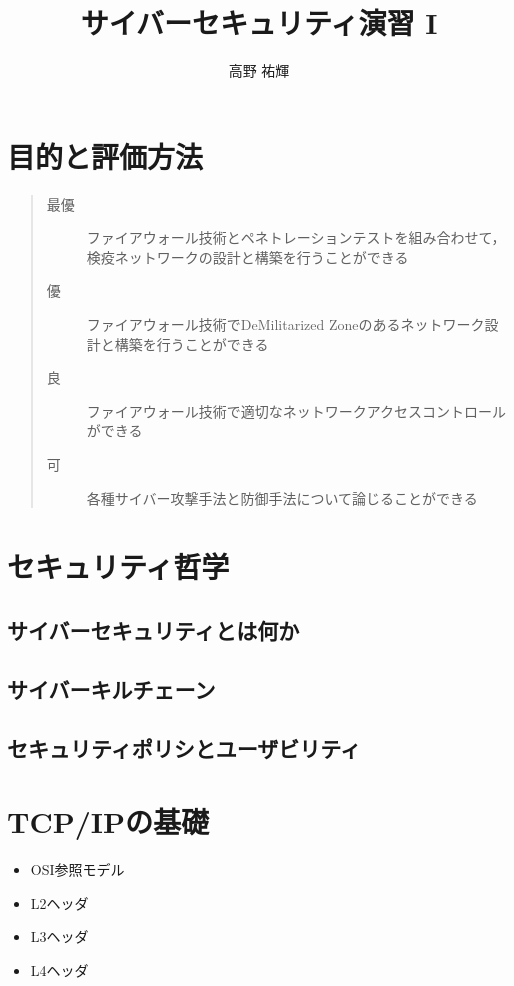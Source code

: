 \documentclass[fleqn]{jsarticle}
\title{サイバーセキュリティ演習 I}
\author{高野 祐輝}
\begin{document}
\maketitle

\section{目的と評価方法}

\begin{quote}
\begin{description}
    \item[最優] ファイアウォール技術とペネトレーションテストを組み合わせて，検疫ネットワークの設計と構築を行うことができる
    \item[優] ファイアウォール技術でDeMilitarized Zoneのあるネットワーク設計と構築を行うことができる
    \item[良] ファイアウォール技術で適切なネットワークアクセスコントロールができる
    \item[可] 各種サイバー攻撃手法と防御手法について論じることができる
\end{description}
\end{quote}


\section{セキュリティ哲学}

\subsection{サイバーセキュリティとは何か}

\subsection{サイバーキルチェーン}

\cite{hutchins2011intelligence}

\subsection{セキュリティポリシとユーザビリティ}

\cite{RFC2196}

\section{TCP/IPの基礎}

\begin{itemize}
    \item OSI参照モデル
    \item L2ヘッダ
    \item L3ヘッダ
    \item L4ヘッダ
\end{itemize}
\end{document}
